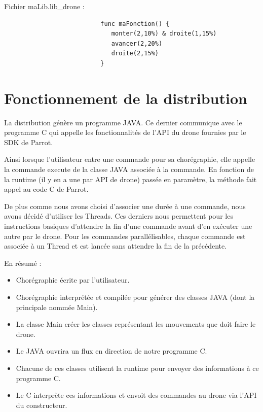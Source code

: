 \documentclass[12pt]{article}
\begin{document}
	\newpage
	Fichier maLib.lib\_drone : \\
   	\begin{figure}[h!]
       		 \begin{center}
            		\begin{verbatim}
		             func maFonction() {
		                monter(2,10%) & droite(1,15%)
		                avancer(2,20%)
		                droite(2,15%)
		             }
           		 \end{verbatim}
        		\end{center}
   	 \end{figure}
   	 
   	 \section{Fonctionnement de la distribution}
   	    
   	    La distribution génère un programme JAVA. Ce dernier communique avec le programme C qui appelle les fonctionnalités de l'API du drone fournies par le SDK de Parrot.
   	    
   	    Ainsi lorsque l'utilisateur entre une commande pour sa chorégraphie, elle appelle la commande execute de la classe JAVA associée à la commande. En fonction de la runtime (il y en a une par API de drone) passée en paramètre, la méthode fait appel au code C de Parrot.
   	    
   	    De plus comme nous avons choisi d'associer une durée à une commande, nous avons décidé d'utiliser les Threads. Ces derniers nous permettent pour les instructions basiques d'attendre la fin d'une commande avant d'en exécuter une autre par le drone. Pour les commandes parallélisables, chaque commande est associée à un Thread et est lancée sans attendre la fin de la précédente.
   	    
   	    En résumé :
   	    \begin{itemize}
    \item Chorégraphie écrite par l'utilisateur.
	\item Chorégraphie interprétée et compilée pour générer des classes JAVA (dont la principale nommée Main).
    \item La classe Main créer les classes représentant les mouvements que doit faire le drone.
    \item Le JAVA ouvrira un flux en direction de notre programme C.
    \item Chacune de ces classes utilisent la runtime pour envoyer des informations à ce programme C.
    \item Le C interprète ces informations et envoit des commandes au drone via l'API du constructeur.
	\end{itemize}
        
\end{document}
